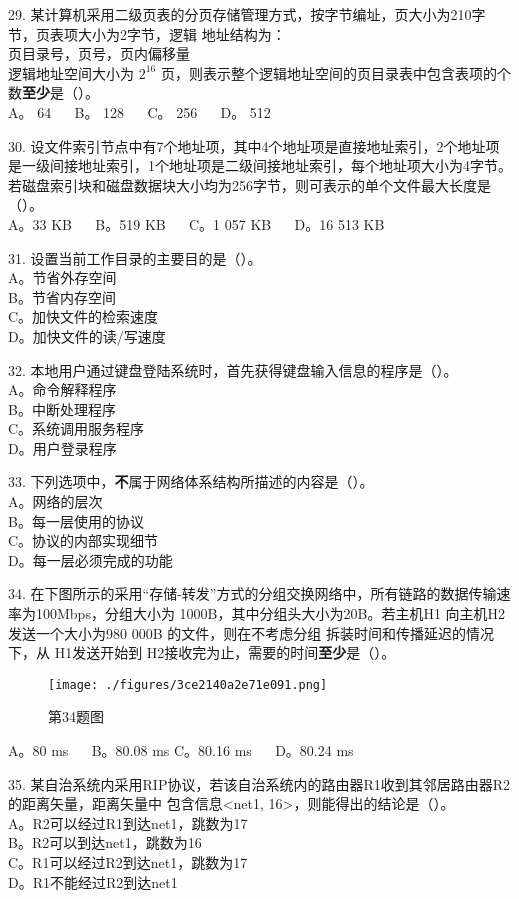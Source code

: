 29. 某计算机采用二级页表的分页存储管理方式，按字节编址，页大小为210字节，页表项大小为2字节，逻辑
地址结构为：  \\
页目录号，页号，页内偏移量 \\
逻辑地址空间大小为 $2^{16}$ 页，则表示整个逻辑地址空间的页目录表中包含表项的个数\textbf{至少}是（）。 \\
A。 64 $\quad$ B。 128 $\quad$ C。 256 $\quad$ D。 512

30. 设文件索引节点中有7个地址项，其中4个地址项是直接地址索引，2个地址项是一级间接地址索引，1个地址项是二级间接地址索引，每个地址项大小为4字节。若磁盘索引块和磁盘数据块大小均为256字节，则可表示的单个文件最大长度是（）。 \\
A。33 KB $\quad$ B。519 KB $\quad$ C。1 057 KB $\quad$ D。16 513 KB

31. 设置当前工作目录的主要目的是（）。 \\
A。节省外存空间 \\
B。节省内存空间 \\
C。加快文件的检索速度 \\
D。加快文件的读/写速度

32. 本地用户通过键盘登陆系统时，首先获得键盘输入信息的程序是（）。  \\
A。命令解释程序 \\
B。中断处理程序 \\
C。系统调用服务程序 \\
D。用户登录程序

33. 下列选项中，\textbf{不}属于网络体系结构所描述的内容是（）。  \\
A。网络的层次  \\
B。每一层使用的协议  \\
C。协议的内部实现细节  \\
D。每一层必须完成的功能

34. 在下图所示的采用“存储-转发”方式的分组交换网络中，所有链路的数据传输速率为100Mbps，分组大小为
1000B，其中分组头大小为20B。若主机H1 向主机H2 发送一个大小为980 000B 的文件，则在不考虑分组
拆装时间和传播延迟的情况下，从 H1发送开始到 H2接收完为止，需要的时间\textbf{至少}是（）。  \\
\begin{figure}[ht]
\centering
\texttt{[image: ./figures/3ce2140a2e71e091.png]}
\caption{第34题图} \label{fig_CSN10_4}
\end{figure}
A。80 ms $\quad$ B。80.08 ms
C。80.16 ms $\quad$ D。80.24 ms

35. 某自治系统内采用RIP协议，若该自治系统内的路由器R1收到其邻居路由器R2的距离矢量，距离矢量中
包含信息<net1, 16>，则能得出的结论是（）。  \\
A。R2可以经过R1到达net1，跳数为17  \\
B。R2可以到达net1，跳数为16  \\
C。R1可以经过R2到达net1，跳数为17  \\
D。R1不能经过R2到达net1  \\

